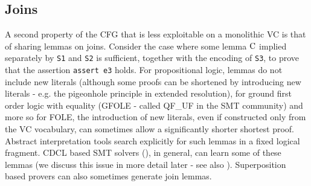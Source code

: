 \subsection*{Joins}
A second property of the CFG that is less exploitable on a monolithic VC is that of sharing lemmas on joins.
Consider the case where some lemma $\mathrm{C}$ implied separately by \lstinline|S1| and \lstinline|S2| is sufficient, together with the encoding of \lstinline|S3|, to prove that the assertion \lstinline|assert e3| holds. 
For propositional logic, lemmas do not include new literals (although some proofs can be shortened by introducing new literals - e.g. the pigeonhole principle in extended resolution), for ground first order logic with equality (GFOLE - called QF\_UF in the SMT community) and more so for FOLE, the introduction of new literals, even if constructed only from the VC  vocabulary, can sometimes allow a significantly shorter shortest proof.
Abstract interpretation tools search explicitly for such lemmas in a fixed logical fragment. CDCL based SMT solvers (\cite{GRASP}), in general, can learn some of these lemmas (we discuss this issue in more detail later - see also \cite{DPLLJoin}). 
Superposition based provers can also sometimes generate join lemmas.

